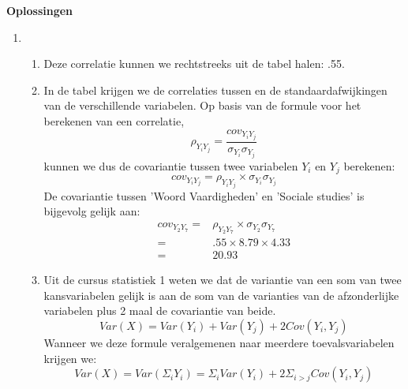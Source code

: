 \OPLOSSING
{
\textbf{Oplossingen}
\begin{enumerate}

\item
\begin{enumerate}
\item Deze correlatie kunnen we rechtstreeks uit de tabel halen: .55.
\item In de tabel krijgen we de correlaties tussen en de standaardafwijkingen van de verschillende variabelen. Op basis van de formule voor het berekenen van een correlatie,
\begin{displaymath}
\rho_{Y_iY_j}=\frac{cov_{Y_iY_j}}{\sigma_{Y_i}\sigma_{Y_j}}
\end{displaymath}
kunnen we dus de covariantie tussen twee variabelen $Y_i$ en $Y_j$ berekenen:
\begin{displaymath}
cov_{Y_iY_j}=\rho_{Y_iY_j} \times \sigma_{Y_i}\sigma_{Y_j}
\end{displaymath}
De covariantie tussen 'Woord Vaardigheden' en 'Sociale studies' is bijgevolg gelijk aan:
\begin{align*}
cov_{Y_2Y_7}=& \rho_{Y_2Y_7} \times \sigma_{Y_2}\sigma_{Y_7}\\
            =& .55 \times 8.79 \times 4.33\\
            =& 20.93
\end{align*}

\item Uit de cursus statistiek 1 weten we dat de variantie van een som van twee kansvariabelen gelijk is aan de som van de varianties van de afzonderlijke variabelen plus 2 maal de covariantie van beide.
\begin{displaymath}
Var(X) = Var(Y_i) + Var(Y_j) + 2Cov(Y_i,Y_j)
\end{displaymath}
Wanneer we deze formule veralgemenen naar meerdere toevalsvariabelen krijgen we:
\begin{displaymath}
Var(X) = Var(\Sigma_iY_i) = \Sigma_iVar(Y_i) + 2\Sigma_{i>j}Cov(Y_i,Y_j)
\end{displaymath}






\end{enumerate} 
\end{enumerate}
}



